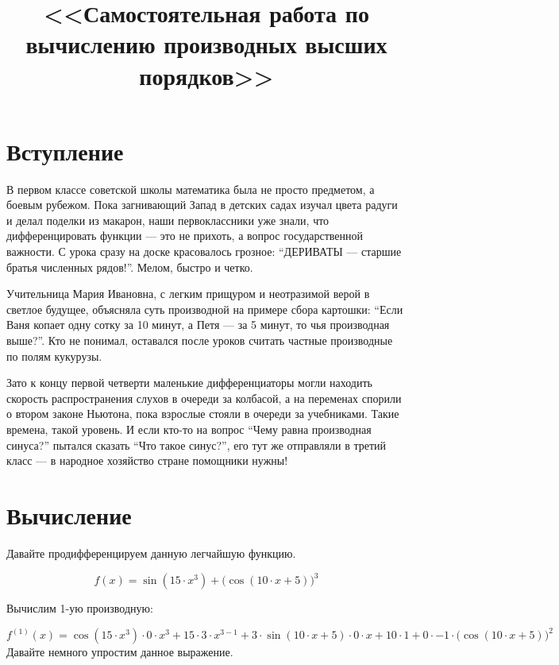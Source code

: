 \documentclass[12pt,a4paper]{extreport}
\title{<<Самостоятельная работа по вычислению производных высших порядков>>}
\begin{document}
\maketitle
\pagebreak
\tableofcontents
\pagebreak
\section{Вступление}
В первом классе советской школы математика была не просто предметом, а боевым рубежом. Пока загнивающий Запад в детских садах изучал цвета радуги и делал поделки из макарон, наши первоклассники уже знали, что дифференцировать функции — это не прихоть, а вопрос государственной важности. С урока сразу на доске красовалось грозное: “ДЕРИВАТЫ — старшие братья численных рядов!”. Мелом, быстро и четко. 

Учительница Мария Ивановна, с легким прищуром и неотразимой верой в светлое будущее, объясняла суть производной на примере сбора картошки: “Если Ваня копает одну сотку за 10 минут, а Петя — за 5 минут, то чья производная выше?”. Кто не понимал, оставался после уроков считать частные производные по полям кукурузы.



Зато к концу первой четверти маленькие дифференциаторы могли находить скорость распространения слухов в очереди за колбасой, а на переменах спорили о втором законе Ньютона, пока взрослые стояли в очереди за учебниками. Такие времена, такой уровень. И если кто-то на вопрос “Чему равна производная синуса?” пытался сказать “Что такое синус?”, его тут же отправляли в третий класс — в народное хозяйство стране помощники нужны!\section{Вычисление}


Давайте продифференцируем данную легчайшую функцию.

\begin{dmath*}
f(x) = \sin(15 \cdot {x}^{3}) + ({\cos(10 \cdot x + 5))}^{3}
\end{dmath*}

Вычислим 1-ую производную:

\begin{dmath*}
f^{(1)}(x) = \cos(15 \cdot {x}^{3}) \cdot 0 \cdot {x}^{3} + 15 \cdot 3 \cdot {x}^{3 - 1} + 3 \cdot \sin(10 \cdot x + 5) \cdot 0 \cdot x + 10 \cdot 1 + 0 \cdot -1 \cdot ({\cos(10 \cdot x + 5))}^{2}
\end{dmath*}
Давайте немного упростим данное выражение.
\end{document}
